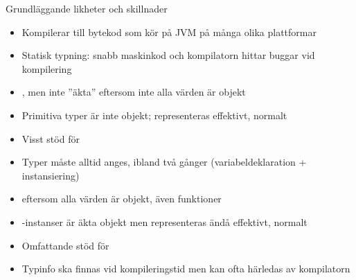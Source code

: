 

\ifkompendium\else

\begin{Slide}{Grundläggande likheter och skillnader}\SlideFontSmall
{}
\begin{itemize}\SlideFontTiny
\item Kompilerar till bytekod som kör på JVM på många olika plattformar
\item Statisk typning: snabb maskinkod och kompilatorn hittar buggar vid kompilering
\end{itemize}

 \vspace{-1em}
\begin{multicols}{2}
\begin{itemize}\SlideFontTiny
\item {}, men inte ''äkta''  eftersom inte alla värden är objekt

\item Primitiva typer är inte objekt; representeras effektivt, normalt 

\item Visst stöd för 

\item Typer måste alltid anges, ibland två gånger (variabeldeklaration + instansiering)
\end{itemize}

\columnbreak

\begin{itemize}\SlideFontTiny
\item {} eftersom alla värden är objekt, även funktioner

\item {}-instanser är äkta objekt men representeras ändå effektivt, normalt  

\item Omfattande stöd för 

\item Typinfo ska finnas vid kompileringstid men kan ofta härledas av kompilatorn
\end{itemize}

\end{multicols}
\end{Slide}


